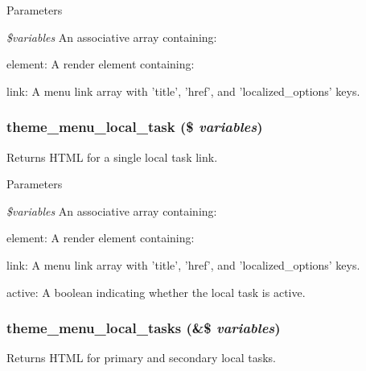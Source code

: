 \begin{DoxyParams}{Parameters}
\item[{\em \$variables}]An associative array containing:
\begin{DoxyItemize}
\item element: A render element containing:
\begin{DoxyItemize}
\item link: A menu link array with 'title', 'href', and 'localized\_\-options' keys. 
\end{DoxyItemize}
\end{DoxyItemize}\end{DoxyParams}
\hypertarget{group__themeable_gacf0d36288bfdf480eb55328d74f65b9c}{
\subsubsection[{theme\_\-menu\_\-local\_\-task}]{\setlength{\rightskip}{0pt plus 5cm}theme\_\-menu\_\-local\_\-task (\$ {\em variables})}}
\label{group__themeable_gacf0d36288bfdf480eb55328d74f65b9c}
Returns HTML for a single local task link.


\begin{DoxyParams}{Parameters}
\item[{\em \$variables}]An associative array containing:
\begin{DoxyItemize}
\item element: A render element containing:
\begin{DoxyItemize}
\item link: A menu link array with 'title', 'href', and 'localized\_\-options' keys.
\item active: A boolean indicating whether the local task is active. 
\end{DoxyItemize}
\end{DoxyItemize}\end{DoxyParams}
\hypertarget{group__themeable_ga86d3fc6b53bc1455c044e181b0501da0}{
\subsubsection[{theme\_\-menu\_\-local\_\-tasks}]{\setlength{\rightskip}{0pt plus 5cm}theme\_\-menu\_\-local\_\-tasks (\&\$ {\em variables})}}
\label{group__themeable_ga86d3fc6b53bc1455c044e181b0501da0}
Returns HTML for primary and secondary local tasks.


